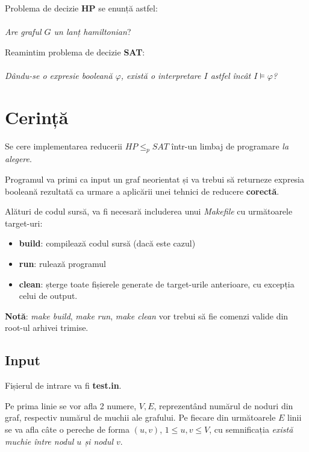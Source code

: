 \documentclass[12pt]{article}
\begin{document}
Problema de decizie {\bf HP} se enunță astfel:

\paragraph{}
\emph{Are graful $G$ un lanț hamiltonian}?\vspace{1em}

Reamintim problema de decizie {\bf SAT}\cite{3}:

\paragraph{}
\emph{Dându-se o expresie booleană $\varphi$, există o interpretare $I$ astfel
încât $I \models \varphi$?}\vspace{1em}

\section{Cerință}
Se cere implementarea reducerii {$HP \leq_p SAT$} într-un limbaj de
programare \emph{la alegere}.

Programul va primi ca input un graf neorientat și va trebui să returneze
expresia booleană rezultată ca urmare a aplicării unei tehnici de reducere
{\bf corectă}.

Alături de codul sursă, va fi necesară includerea unui \emph{Makefile} cu
următoarele target-uri:

\begin{itemize}
  \setlength{\itemsep}{0em}
  \item {\bf build}: compilează codul sursă (dacă este cazul)
  \item {\bf run}: rulează programul
  \item {\bf clean}: șterge toate fișierele generate de target-urile
    anterioare, cu excepția celui de output.
\end{itemize}

{\bf Notă}: \emph{make build}, \emph{make run}, \emph{make clean} vor trebui
să fie comenzi valide din root-ul arhivei trimise.

\subsection{Input}
Fișierul de intrare va fi {\bf test.in}.

Pe prima linie se vor afla 2 numere, $V, E$, reprezentând numărul de noduri
din graf, respectiv numărul de muchii ale grafului.
Pe fiecare din următoarele $E$ linii se va afla câte o pereche de forma
$(u, v)$, $1 \le u, v \le V$, cu semnificația \emph{există muchie între nodul
$u$ și nodul $v$}.
\end{document}
